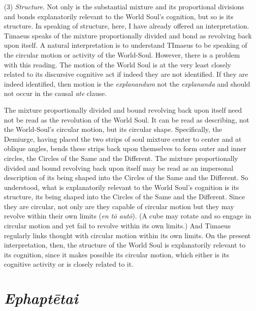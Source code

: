 (3) \emph{Structure}. Not only is the substantial mixture and its proportional divisions and bonds explanatorily relevant to the World Soul's cognition, but so is its structure. In speaking of structure, here, I have already offered an interpretation. Timaeus speaks of the mixture proportionally divided and bond as revolving back upon itself. A natural interpretation is to understand TImaeus to be speaking of the circular motion or activity of the World-Soul. However, there is a problem with this reading. The motion of the World Soul is at the very least closely related to its discursive cognitive act if indeed they are not identified. If they are indeed identified, then motion is the \emph{explanandum} not the \emph{explananda} and should not occur in the causal \emph{ate} clause. 

The mixture proportionally divided and bound revolving back upon itself need not be read as the revolution of the World Soul. It can be read as describing, not the World-Soul's circular motion, but its circular shape. Specifically, the Demiurge, having placed the two strips of soul mixture center to center and at oblique angles, bends these strips back upon themselves to form outer and inner circles, the Circles of the Same and the Different. The mixture proportionally divided and bound revolving back upon itself may be read as an impersonal description of its being shaped into the Circles of the Same and the Different. So understood, what is explanatorily relevant to the World Soul's cognition is its structure, its being shaped into the Circles of the Same and the Different. Since they are circular, not only are they capable of circular motion but they may revolve within their own limits (\emph{en tō autō}). (A cube may rotate and so engage in circular motion and yet fail to revolve within its own limits.) And Timaeus regularly links thought with circular motion within its own limits. On the present interpretation, then, the structure of the World Soul is explanatorily relevant to its cognition, since it makes possible its circular motion, which either is its cognitive activity or is closely related to it.



\section{\emph{Ephaptētai}} %
\label{sec:_emph_ephatetai}

